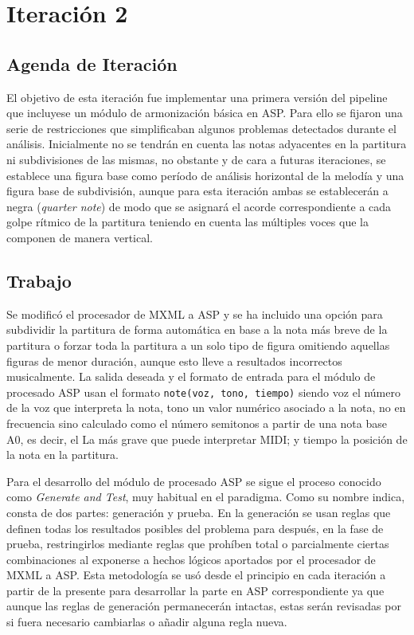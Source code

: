 \section{Iteración 2}
\subsection{Agenda de Iteración}
El objetivo de esta iteración fue implementar una primera versión del pipeline que incluyese un módulo de armonización básica en ASP. Para ello se fijaron una serie de restricciones que simplificaban algunos problemas detectados durante el análisis. Inicialmente no se tendrán en cuenta las notas adyacentes en la partitura ni subdivisiones de las mismas, no obstante y de cara a futuras iteraciones, se establece una figura base como período de análisis horizontal de la melodía y una figura base de subdivisión, aunque para esta iteración ambas se establecerán a negra (\textit{quarter note}) de modo que se asignará el acorde correspondiente a cada golpe rítmico de la partitura teniendo en cuenta las múltiples voces que la componen de manera vertical.

\subsection{Trabajo}
Se modificó el procesador de MXML a ASP y se ha incluido una opción para subdividir la partitura de forma automática en base a la nota más breve de la partitura o forzar toda la partitura a un solo tipo de figura omitiendo aquellas figuras de menor duración, aunque esto lleve a resultados incorrectos musicalmente. La salida deseada y el formato de entrada para el módulo de procesado ASP usan el formato \texttt{note(voz, tono, tiempo)} siendo voz el número de la voz que interpreta la nota, tono un valor numérico asociado a la nota, no en frecuencia sino calculado como el número semitonos a partir de una nota base A0, es decir, el La más grave que puede interpretar MIDI; y tiempo la posición de la nota en la partitura.

Para el desarrollo del módulo de procesado ASP se sigue el proceso conocido como \textit{Generate and Test}, muy habitual en el paradigma. Como su nombre indica, consta de dos partes: generación y prueba. En la generación se usan reglas que definen todas los resultados posibles del problema para después, en la fase de prueba, restringirlos mediante reglas que prohíben total o parcialmente ciertas combinaciones al exponerse a hechos lógicos aportados por el procesador de MXML a ASP. Esta metodología se usó desde el principio en cada iteración a partir de la presente para desarrollar la parte en ASP correspondiente ya que aunque las reglas de generación permanecerán intactas, estas serán revisadas por si fuera necesario cambiarlas o añadir alguna regla nueva.

